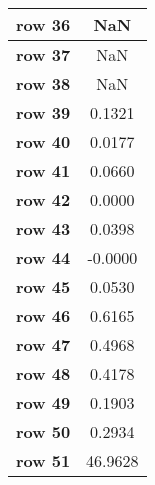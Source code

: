 \begin{tiny}
\begin{tabular}{|l|c|}
\textbf{row 36}&NaN\\\hline
\textbf{row 37}&NaN\\\hline
\textbf{row 38}&NaN\\\hline
\textbf{row 39}&0.1321\\\hline
\textbf{row 40}&0.0177\\\hline
\textbf{row 41}&0.0660\\\hline
\textbf{row 42}&0.0000\\\hline
\textbf{row 43}&0.0398\\\hline
\textbf{row 44}&-0.0000\\\hline
\textbf{row 45}&0.0530\\\hline
\textbf{row 46}&0.6165\\\hline
\textbf{row 47}&0.4968\\\hline
\textbf{row 48}&0.4178\\\hline
\textbf{row 49}&0.1903\\\hline
\textbf{row 50}&0.2934\\\hline
\textbf{row 51}&46.9628\\\hline
\end{tabular}
\end{tiny}